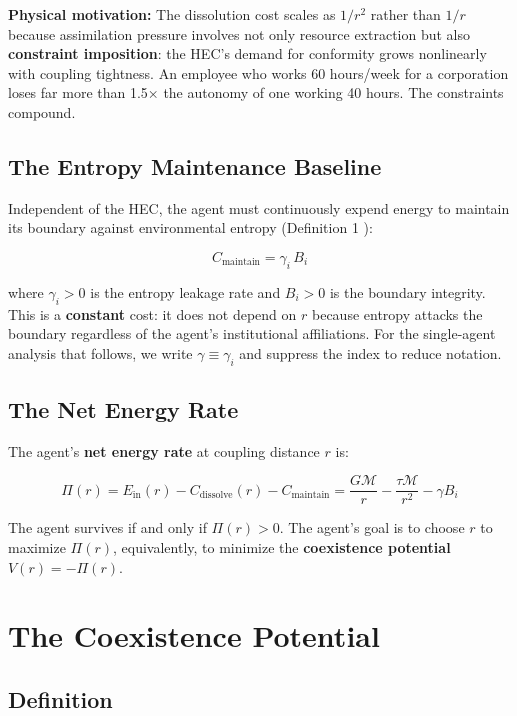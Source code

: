 \documentclass[11pt]{article}
\theoremstyle{plain}
\theoremstyle{definition}
\theoremstyle{remark}
\let\origsection\section
\renewcommand{\section}{\needspace{12\baselineskip}\origsection}
\let\origsubsection\subsection
\renewcommand{\subsection}{\needspace{7\baselineskip}\origsubsection}
\begin{document}
\textbf{Physical motivation:} The dissolution cost scales as \(1/r^2\)
rather than \(1/r\) because assimilation pressure involves not only
resource extraction but also \textbf{constraint imposition}: the HEC's
demand for conformity grows nonlinearly with coupling tightness. An
employee who works 60 hours/week for a corporation loses far more than
1.5× the autonomy of one working 40 hours. The constraints compound.

\subsection{The Entropy Maintenance
Baseline}\label{the-entropy-maintenance-baseline}

Independent of the HEC, the agent must continuously expend energy to
maintain its boundary against environmental entropy (Definition 1
\citep{TC-IV}):

\[C_{\text{maintain}} = \gamma_i \, B_i\]

where \(\gamma_i > 0\) is the entropy leakage rate and \(B_i > 0\) is
the boundary integrity. This is a \textbf{constant} cost: it does not
depend on \(r\) because entropy attacks the boundary regardless of the
agent's institutional affiliations. For the single-agent analysis that
follows, we write \(\gamma \equiv \gamma_i\) and suppress the index to
reduce notation.

\subsection{The Net Energy Rate}\label{the-net-energy-rate}

The agent's \textbf{net energy rate} at coupling distance \(r\) is:

\[\Pi(r) = E_{\text{in}}(r) - C_{\text{dissolve}}(r) - C_{\text{maintain}} = \frac{G \mathcal{M}}{r} - \frac{\tau \mathcal{M}}{r^2} - \gamma B_i\]

The agent survives if and only if \(\Pi(r) > 0\). The agent's goal is to
choose \(r\) to maximize \(\Pi(r)\), equivalently, to minimize the
\textbf{coexistence potential} \(V(r) = -\Pi(r)\).

\section{The Coexistence Potential}\label{the-coexistence-potential}

\subsection{Definition}\label{definition}
\end{document}
